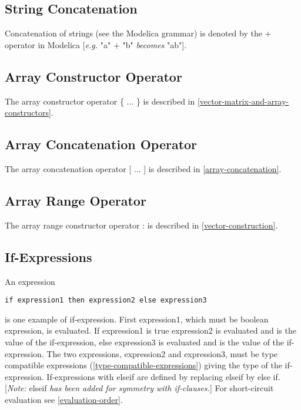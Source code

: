 \subsection{String Concatenation}

Concatenation of strings (see the Modelica grammar) is denoted by the +
operator in Modelica {[}\emph{e.g.} "a" + "b" \emph{becomes} "ab"{]}.

\subsection{Array Constructor Operator}

The array constructor operator \{ ... \} is described in \autoref{vector-matrix-and-array-constructors}.

\subsection{Array Concatenation Operator}

The array concatenation operator {[} ... {]} is described in \autoref{array-concatenation}.

\subsection{Array Range Operator}

The array range constructor operator : is described in \autoref{vector-construction}.

\subsection{If-Expressions}

An expression
\begin{lstlisting}[language=modelica]
if expression1 then expression2 else expression3
\end{lstlisting}

is one example of if-expression. First expression1, which must be
boolean expression, is evaluated. If expression1 is true expression2 is
evaluated and is the value of the if-expression, else expression3 is
evaluated and is the value of the if-expression. The two expressions,
expression2 and expression3, must be type compatible expressions
(\autoref{type-compatible-expressions}) giving the type of the if-expression. If-expressions with
elseif are defined by replacing elseif by else if. {[}\emph{Note:}
elseif \emph{has been added for symmetry with if-clauses.}{]} For
short-circuit evaluation see \autoref{evaluation-order}.

